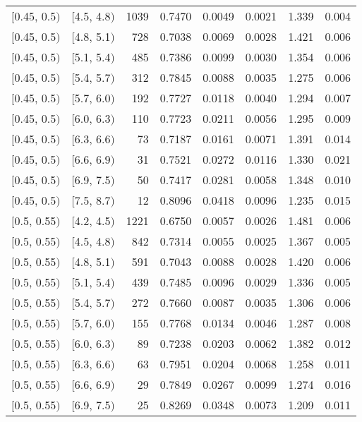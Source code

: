 \begin{longtable}{| l | l | r | r | r | r | r | r |}
        $[$0.45, 0.5$)$ & $[$4.5, 4.8$)$ & 1039 & 0.7470 & 0.0049 & 0.0021 & 1.339 & 0.004 \\
        $[$0.45, 0.5$)$ & $[$4.8, 5.1$)$ & 728 & 0.7038 & 0.0069 & 0.0028 & 1.421 & 0.006 \\
        $[$0.45, 0.5$)$ & $[$5.1, 5.4$)$ & 485 & 0.7386 & 0.0099 & 0.0030 & 1.354 & 0.006 \\
        $[$0.45, 0.5$)$ & $[$5.4, 5.7$)$ & 312 & 0.7845 & 0.0088 & 0.0035 & 1.275 & 0.006 \\
        $[$0.45, 0.5$)$ & $[$5.7, 6.0$)$ & 192 & 0.7727 & 0.0118 & 0.0040 & 1.294 & 0.007 \\
        $[$0.45, 0.5$)$ & $[$6.0, 6.3$)$ & 110 & 0.7723 & 0.0211 & 0.0056 & 1.295 & 0.009 \\
        $[$0.45, 0.5$)$ & $[$6.3, 6.6$)$ & 73 & 0.7187 & 0.0161 & 0.0071 & 1.391 & 0.014 \\
        $[$0.45, 0.5$)$ & $[$6.6, 6.9$)$ & 31 & 0.7521 & 0.0272 & 0.0116 & 1.330 & 0.021 \\
        $[$0.45, 0.5$)$ & $[$6.9, 7.5$)$ & 50 & 0.7417 & 0.0281 & 0.0058 & 1.348 & 0.010 \\
        $[$0.45, 0.5$)$ & $[$7.5, 8.7$)$ & 12 & 0.8096 & 0.0418 & 0.0096 & 1.235 & 0.015 \\
        $[$0.5, 0.55$)$ & $[$4.2, 4.5$)$ & 1221 & 0.6750 & 0.0057 & 0.0026 & 1.481 & 0.006 \\
        $[$0.5, 0.55$)$ & $[$4.5, 4.8$)$ & 842 & 0.7314 & 0.0055 & 0.0025 & 1.367 & 0.005 \\
        $[$0.5, 0.55$)$ & $[$4.8, 5.1$)$ & 591 & 0.7043 & 0.0088 & 0.0028 & 1.420 & 0.006 \\
        $[$0.5, 0.55$)$ & $[$5.1, 5.4$)$ & 439 & 0.7485 & 0.0096 & 0.0029 & 1.336 & 0.005 \\
        $[$0.5, 0.55$)$ & $[$5.4, 5.7$)$ & 272 & 0.7660 & 0.0087 & 0.0035 & 1.306 & 0.006 \\
        $[$0.5, 0.55$)$ & $[$5.7, 6.0$)$ & 155 & 0.7768 & 0.0134 & 0.0046 & 1.287 & 0.008 \\
        $[$0.5, 0.55$)$ & $[$6.0, 6.3$)$ & 89 & 0.7238 & 0.0203 & 0.0062 & 1.382 & 0.012 \\
        $[$0.5, 0.55$)$ & $[$6.3, 6.6$)$ & 63 & 0.7951 & 0.0204 & 0.0068 & 1.258 & 0.011 \\
        $[$0.5, 0.55$)$ & $[$6.6, 6.9$)$ & 29 & 0.7849 & 0.0267 & 0.0099 & 1.274 & 0.016 \\
        $[$0.5, 0.55$)$ & $[$6.9, 7.5$)$ & 25 & 0.8269 & 0.0348 & 0.0073 & 1.209 & 0.011 \\

\end{longtable}
